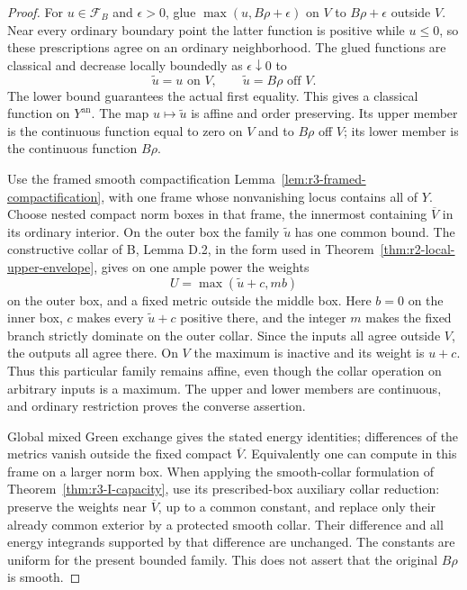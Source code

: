 \documentclass[11pt,a4paper]{article}
\numberwithin{equation}{section}
\theoremstyle{definition}
\theoremstyle{remark}
\newcommand{\an}{\mathrm{an}}
\begin{document}
\begin{proof}
For $u\in\mathcal F_B$ and $\epsilon>0$, glue
$\max(u,B\rho+\epsilon)$ on $V$ to $B\rho+\epsilon$ outside
$V$. Near every ordinary boundary point the latter function is
positive while $u\leq0$, so these prescriptions agree on an
ordinary neighborhood. The glued functions are classical and
decrease locally boundedly as $\epsilon\downarrow0$ to
\[
 \widetilde u=u\text{ on }V,\qquad
 \widetilde u=B\rho\text{ off }V.
\]
The lower bound guarantees the actual first equality. This gives
a classical function on $Y^{\an}$. The map $u\mapsto\widetilde u$
is affine and order preserving. Its upper member is the continuous
function equal to zero on $V$ and to $B\rho$ off $V$; its lower
member is the continuous function $B\rho$.

Use the framed smooth compactification
Lemma~\ref{lem:r3-framed-compactification}, with one frame whose
nonvanishing locus contains all of $Y$. Choose nested compact
norm boxes in that frame, the innermost containing $\overline V$
in its ordinary interior. On the outer box the family
$\widetilde u$ has one common bound. The constructive collar of
B, Lemma D.2, in the form used in
Theorem~\ref{thm:r2-local-upper-envelope}, gives on one ample
power the weights
\[
 U=\max(\widetilde u+c,mb)
\]
on the outer box, and a fixed metric outside the middle box.
Here $b=0$ on the inner box, $c$ makes every
$\widetilde u+c$ positive there, and the integer $m$ makes the
fixed branch strictly dominate on the outer collar. Since the
inputs all agree outside $V$, the outputs all agree there.
On $V$ the maximum is inactive and its weight is $u+c$.
Thus this particular family remains affine, even though the
collar operation on arbitrary inputs is a maximum. The upper
and lower members are continuous, and ordinary restriction
proves the converse assertion.

Global mixed Green exchange gives the stated energy identities;
differences of the metrics vanish outside the fixed compact
$\overline V$. Equivalently one can compute in this frame on a
larger norm box. When applying the smooth-collar formulation of
Theorem~\ref{thm:r3-I-capacity}, use its prescribed-box auxiliary
collar reduction: preserve the weights near $\overline V$, up
to a common constant, and replace only their already common
exterior by a protected smooth collar. Their difference and all
energy integrands supported by that difference are unchanged.
The constants are uniform for the present bounded family. This
does not assert that the original $B\rho$ is smooth.
\end{proof}
\end{document}
